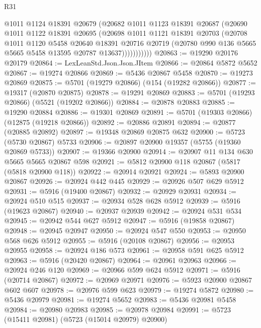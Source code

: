 \begin{lexlean}{R31}
\begin{coremodule}
                @1011
                @1124
                @18391
                @20679
                (@20682
                  @1011
                  @1123
                  @18391
                  @20687
                  (@20690
                    @1011
                    @1122
                    @18391
                    @20695
                    (@20698
                      @1011
                      @1121
                      @18391
                      @20703
                      (@20708
                        @1011
                        @1120
                        @5458
                        @20640
                        @18391
                        @20716
                        @20719
                        (@20780 @990 @136 @5665 @5665 @5458 @13595 @20787 @13637)))))))))))
@20863 := @19290 @20176 @20179
@20864 := LexLeanStd.Json.Json.JItem
@20866 := @20864 @5872 @5652
@20867 := @19274 @20866
@20869 := @5436 @20867 @5458
@20870 := @19273 @20869
@20875 := @5701 (@19279 @20866) (@154 (@19282 @20866))
@20877 := @19317 (@20870 @20875)
@20878 := @19291 @20869
@20883 := @5701 (@19293 @20866) (@5521 (@19202 @20866))
@20884 := @20878 @20883
@20885 := @19290 @20884
@20886 := @19301 @20869
@20891 := @5701 (@19303 @20866) (@12875 (@19218 @20866))
@20892 := @20886 @20891
@20894 := @20877 (@20885 @20892)
@20897 := @19348 @20869 @20875 @632
@20900 := @5723 (@5730 @20867) @5733
@20906 := @20897 @20900 @19357 (@5755 (@19360 @20869 @5733))
@20907 := @19366 @20900
@20914 := @20907 @11 @134 @630 @5665 @5665 @20867 @598
@20921 := @5812 @20900 @118 @20867 (@5817 (@5818 @20900 @118))
@20922 := @20914 @20921
@20924 := @5893 @20900 @20867
@20926 := @20924 @442 @445
@20929 := @20926 @507 @629 @5912
@20931 := @5916 (@19400 @20867)
@20932 := @20929 @20931
@20934 := @20924 @510 @515
@20937 := @20934 @528 @628 @5912
@20939 := @5916 (@19623 @20867)
@20940 := @20937 @20939
@20942 := @20924 @531 @534
@20945 := @20942 @544 @627 @5912
@20947 := @5916 (@19858 @20867)
@20948 := @20945 @20947
@20950 := @20924 @547 @550
@20953 := @20950 @568 @626 @5912
@20955 := @5916 (@20108 @20867)
@20956 := @20953 @20955
@20958 := @20924 @186 @573
@20961 := @20958 @591 @625 @5912
@20963 := @5916 (@20420 @20867)
@20964 := @20961 @20963
@20966 := @20924 @246 @120
@20969 := @20966 @599 @624 @5912
@20971 := @5916 (@20714 @20867)
@20972 := @20969 @20971
@20976 := @5923 @20900 @20867 @602 @607
@20978 := @20976 @599 @623
@20979 := @19274 @5872
@20980 := @5436 @20979
@20981 := @19274 @5652
@20983 := @5436 @20981 @5458
@20984 := @20980 @20983
@20985 := @20978 @20984
@20991 := @5723 (@15411 @20981) (@5723 (@15014 @20979) @20900)

\end{coremodule}
\end{lexlean}
